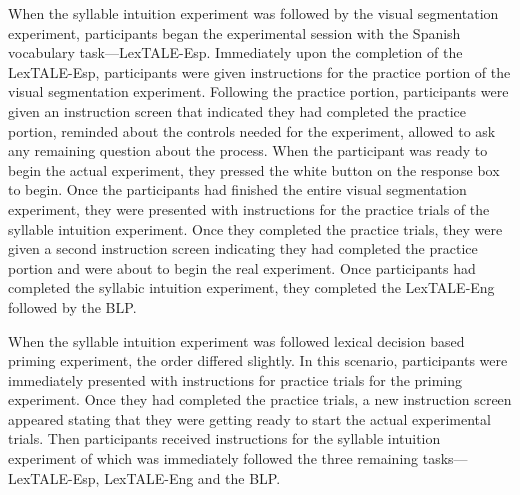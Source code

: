 When the syllable intuition experiment was followed by the visual segmentation experiment, %
participants began the experimental session with the Spanish vocabulary task---LexTALE-Esp. Immediately upon the completion of the LexTALE-Esp, participants were given instructions for the practice portion of the visual segmentation experiment. Following the practice portion, participants were given an instruction screen that indicated they had completed the practice portion, reminded about the controls needed for the experiment, allowed to ask any remaining question about the process. When the participant was ready to begin the actual experiment, they pressed the white button on the response box to begin. Once the participants had finished the entire visual segmentation experiment, they were presented with instructions for the practice trials of the syllable intuition experiment. Once they completed the practice trials, they were given a second instruction screen indicating they had completed the practice portion and were about to begin the real experiment. Once participants had completed the syllabic intuition experiment, they completed the LexTALE-Eng followed by the BLP. 

When the syllable intuition experiment was followed lexical decision based priming experiment, the order differed slightly. In this scenario, participants were immediately presented with instructions for practice trials for the priming experiment. Once they had completed the practice trials, a new instruction screen appeared stating that they were getting ready to start the actual experimental trials. Then participants received instructions for the syllable intuition experiment of which was immediately followed the three remaining tasks---LexTALE-Esp, LexTALE-Eng and the BLP.

